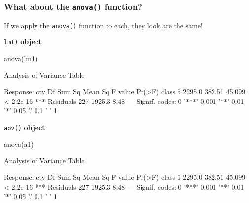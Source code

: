 \documentclass[a4paper]{article}\usepackage[]{graphicx}\usepackage[]{xcolor}
\begin{document}
\subsubsection{What about the \lstinline|anova()| function?}
If we apply the \lstinline|anova()| function to each, they look are the same!\\
\begin{minipage}[t]{0.49\textwidth}
\lstinline|lm()| \textbf{object}
\begin{Schunk}
\begin{Sinput}
anova(lm1)
\end{Sinput}
\begin{Soutput}
Analysis of Variance Table

Response: cty
           Df Sum Sq Mean Sq F value    Pr(>F)    
class       6 2295.0  382.51  45.099 < 2.2e-16 ***
Residuals 227 1925.3    8.48                      
---
Signif. codes:  0 '***' 0.001 '**' 0.01 '*' 0.05 '.' 0.1 ' ' 1
\end{Soutput}
\end{Schunk}
\end{minipage}
\hspace{0.02\textwidth}
\begin{minipage}[t]{0.49\textwidth}
\lstinline|aov()| \textbf{object}
\begin{Schunk}
\begin{Sinput}
anova(a1)
\end{Sinput}
\begin{Soutput}
Analysis of Variance Table

Response: cty
           Df Sum Sq Mean Sq F value    Pr(>F)    
class       6 2295.0  382.51  45.099 < 2.2e-16 ***
Residuals 227 1925.3    8.48                      
---
Signif. codes:  0 '***' 0.001 '**' 0.01 '*' 0.05 '.' 0.1 ' ' 1
\end{Soutput}
\end{Schunk}
\end{minipage}
\end{document}
